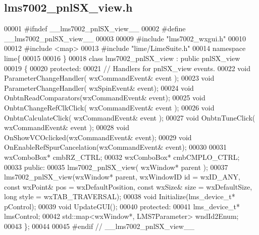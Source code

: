 \subsection{lms7002\+\_\+pnl\+S\+X\+\_\+view.\+h}
\label{lms7002__pnlSX__view_8h_source}

\begin{DoxyCode}
00001 \textcolor{preprocessor}{#ifndef \_\_lms7002\_pnlSX\_view\_\_}
00002 \textcolor{preprocessor}{#define \_\_lms7002\_pnlSX\_view\_\_}
00003 
00009 \textcolor{preprocessor}{#include "lms7002_wxgui.h"}
00010 
00012 \textcolor{preprocessor}{#include <map>}
00013 \textcolor{preprocessor}{#include "lime/LimeSuite.h"}
00014 \textcolor{keyword}{namespace }lime\{
00015 
00016 \}
00018 \textcolor{keyword}{class }lms7002_pnlSX_view : \textcolor{keyword}{public} pnlSX_view
00019 \{
00020     \textcolor{keyword}{protected}:
00021         \textcolor{comment}{// Handlers for pnlSX\_view events.}
00022         \textcolor{keywordtype}{void} ParameterChangeHandler( wxCommandEvent& event );
00023         \textcolor{keywordtype}{void} ParameterChangeHandler( wxSpinEvent& event);
00024         \textcolor{keywordtype}{void} OnbtnReadComparators(wxCommandEvent& event);
00025         \textcolor{keywordtype}{void} OnbtnChangeRefClkClick( wxCommandEvent& event );
00026         \textcolor{keywordtype}{void} OnbtnCalculateClick( wxCommandEvent& event );
00027         \textcolor{keywordtype}{void} OnbtnTuneClick( wxCommandEvent& event );
00028         \textcolor{keywordtype}{void} OnShowVCOclicked(wxCommandEvent& event);
00029         \textcolor{keywordtype}{void} OnEnableRefSpurCancelation(wxCommandEvent& event);
00030 
00031         wxComboBox* cmbRZ_CTRL;
00032         wxComboBox* cmbCMPLO_CTRL;
00033     \textcolor{keyword}{public}:
00035         lms7002_pnlSX_view( wxWindow* parent );
00037     lms7002_pnlSX_view(wxWindow* parent, wxWindowID \textcolor{keywordtype}{id} = wxID\_ANY, \textcolor{keyword}{const} wxPoint& pos = wxDefaultPosition, \textcolor{keyword}{
      const} wxSize& size = wxDefaultSize, \textcolor{keywordtype}{long} style = wxTAB\_TRAVERSAL);
00038     \textcolor{keywordtype}{void} Initialize(lms_device_t* pControl);
00039     \textcolor{keywordtype}{void} UpdateGUI();
00040 \textcolor{keyword}{protected}:
00041     lms_device_t* lmsControl;
00042     std::map<wxWindow*, LMS7Parameter> wndId2Enum;
00043 \};
00044 
00045 \textcolor{preprocessor}{#endif // \_\_lms7002\_pnlSX\_view\_\_}
\end{DoxyCode}
